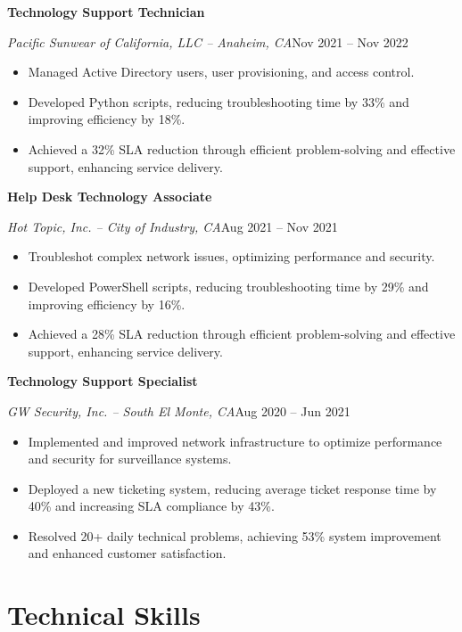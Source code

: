 \documentclass[a4paper]{article}
\begin{document}
\begin{minipage}[t]{0.62\textwidth}
    \vspace{0.5em}
    \textbf{Technology Support Technician}\par
    \textit{Pacific Sunwear of California, LLC -- Anaheim, CA}\hfill Nov 2021 -- Nov 2022

    \begin{itemize}[noitemsep,nolistsep]
        \item Managed Active Directory users, user provisioning, and access control.
        \item Developed Python scripts, reducing troubleshooting time by 33\% and improving efficiency by 18\%.
        \item Achieved a 32\% SLA reduction through efficient problem-solving and effective support, enhancing service delivery.
    \end{itemize}

    \vspace{0.5em}
    \textbf{Help Desk Technology Associate}\par
    \textit{Hot Topic, Inc. -- City of Industry, CA}\hfill Aug 2021 -- Nov 2021

    \begin{itemize}[noitemsep,nolistsep]
        \item Troubleshot complex network issues, optimizing performance and security.
        \item Developed PowerShell scripts, reducing troubleshooting time by 29\% and improving efficiency by 16\%.
        \item Achieved a 28\% SLA reduction through efficient problem-solving and effective support, enhancing service delivery.
    \end{itemize}

    \vspace{0.5em}
    \textbf{Technology Support Specialist}\par
    \textit{GW Security, Inc. -- South El Monte, CA}\hfill Aug 2020 -- Jun 2021

    \begin{itemize}[noitemsep,nolistsep]
        \item Implemented and improved network infrastructure to optimize performance and security for surveillance systems.
        \item Deployed a new ticketing system, reducing average ticket response time by 40\% and increasing SLA compliance by 43\%.
        \item Resolved 20+ daily technical problems, achieving 53\% system improvement and enhanced customer satisfaction.
    \end{itemize}

    \section{Technical Skills}
    \begin{itemize}
        \apptechnicalskills{}
    \end{itemize}
\end{minipage}
\end{document}
